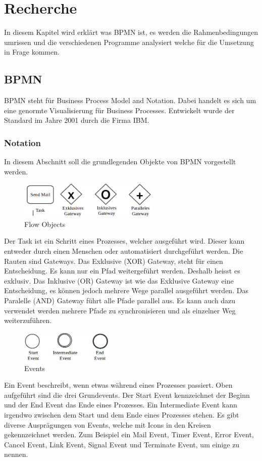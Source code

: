 \chapter{Recherche}

In diesem Kapitel wird erklärt was BPMN ist, es werden die Rahmenbedingungen umrissen und die verschiedenen Programme analysiert welche für die Umsetzung in Frage kommen.

\section{BPMN}
BPMN steht für Business Process Model and Notation. Dabei handelt es sich um eine genormte Visualisierung für Business Processes. Entwickelt wurde der Standard im Jahre 2001 durch die Firma IBM.

\subsection{Notation}
\label{sec:Recherche:bpmn:notation}
In diesem Abschnitt soll die grundlegenden Objekte von BPMN vorgestellt werden.

\begin{figure}[H]
	\centering
	\includegraphics[width=0.6\textwidth]{images/bpmn-flow-objects.png}
	\caption{Flow Objects}
	\label{fig:recherche:bpmn:flowobjects}
\end{figure}
Der Task ist ein Schritt eines Prozesses, welcher ausgeführt wird. Dieser kann entweder durch einen Menschen oder automatisiert durchgeführt werden. Die Rauten sind Gateways. Das Exklusive (XOR) Gateway, steht für einen Entscheidung. Es kann nur ein Pfad weitergeführt werden. Deshalb heisst es exklusiv. Das Inklusive (OR) Gateway ist wie das Exklusive Gateway eine Entscheidung, es können jedoch mehrere Wege parallel ausgeführt werden. Das Paralelle (AND) Gateway führt alle Pfade parallel aus. Es kann auch dazu verwendet werden mehrere Pfade zu synchronisieren und als einzelner Weg weiterzuführen.

\begin{figure}[H]
	\centering
	\includegraphics[width=0.4\textwidth]{images/bpmn-flow-objects2.png}
	\caption{Events}
	\label{fig:recherche:bpmn:events}
\end{figure}
Ein Event beschreibt, wenn etwas während eines Prozesses passiert. Oben aufgeführt sind die drei Grundevents. Der Start Event kennzeichnet der Beginn und der End Event das Ende eines Prozesses. Ein Intermediate Event kann irgendwo zwischen dem Start und dem Ende eines Prozesses stehen. Es gibt diverse Ausprägungen von Events, welche mit Icons in den Kreisen gekennzeichnet werden. Zum Beispiel ein Mail Event, Timer Event, Error Event, Cancel Event, Link Event, Signal Event und Terminate Event, um einige zu nennen.

